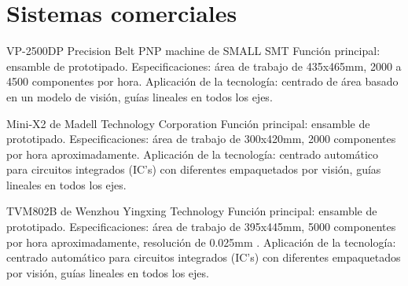 \section{Sistemas comerciales}
\label{Sistemas_comerciales}

VP-2500DP Precision Belt PNP machine de SMALL SMT \newline
Funci\'on principal: ensamble de prototipado.\newline
Especificaciones: \'area de trabajo de 435x465mm, 2000 a 4500 componentes por hora.\newline
Aplicaci\'on de la tecnolog\'ia: centrado de \'area basado en un modelo de visi\'on, gu\'ias lineales en todos los  ejes.\par

Mini-X2 de Madell Technology Corporation\newline
Funci\'on principal: ensamble de prototipado.\newline
Especificaciones: \'area de trabajo de 300x420mm, 2000 componentes por hora aproximadamente.\newline
Aplicaci\'on de la tecnolog\'ia: centrado autom\'atico para circuitos integrados (IC's) con diferentes empaquetados por visi\'on, gu\'ias lineales en todos los  ejes.\par

TVM802B de Wenzhou Yingxing Technology\newline
Funci\'on principal: ensamble de prototipado.\newline
Especificaciones: \'area de trabajo de 395x445mm, 5000 componentes por hora aproximadamente, resoluci\'on de  0.025mm .\newline
Aplicaci\'on de la tecnolog\'ia: centrado autom\'atico para circuitos integrados (IC's) con diferentes empaquetados por visi\'on, gu\'ias lineales en todos los  ejes.